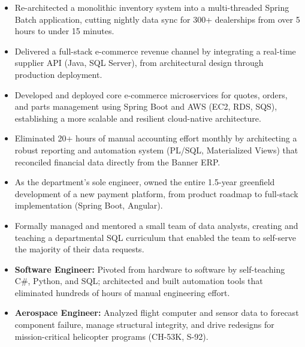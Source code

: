 \begin{itemize}
    \item Re-architected a monolithic inventory system into a multi-threaded Spring Batch application, cutting nightly data sync for 300+ dealerships from over 5 hours to under 15 minutes.
    \item Delivered a full-stack e-commerce revenue channel by integrating a real-time supplier API (Java, SQL Server), from architectural design through production deployment.
    \item Developed and deployed core e-commerce microservices for quotes, orders, and parts management using Spring Boot and AWS (EC2, RDS, SQS), establishing a more scalable and resilient cloud-native architecture.
\end{itemize}
\vspace{\spacingBetweenJobs}

\begin{itemize}
    \item Eliminated 20+ hours of manual accounting effort monthly by architecting a robust reporting and automation system (PL/SQL, Materialized Views) that reconciled financial data directly from the Banner ERP.
    \item As the department's sole engineer, owned the entire 1.5-year greenfield development of a new payment platform, from product roadmap to full-stack implementation (Spring Boot, Angular).
    \item Formally managed and mentored a small team of data analysts, creating and teaching a departmental SQL curriculum that enabled the team to self-serve the majority of their data requests.
\end{itemize}
\vspace{\spacingBetweenJobs}

\begin{itemize}
    \item \textbf{Software Engineer:} Pivoted from hardware to software by self-teaching C\#, Python, and SQL; architected and built automation tools that eliminated hundreds of hours of manual engineering effort.
    \item \textbf{Aerospace Engineer:} Analyzed flight computer and sensor data to forecast component failure, manage structural integrity, and drive redesigns for mission-critical helicopter programs (CH-53K, S-92).
\end{itemize}
\vspace{\spacingBetweenJobs}

